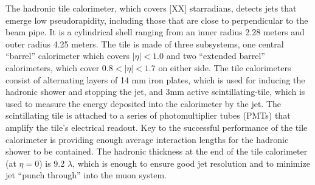 
The hadronic tile calorimeter, which covers [XX] starradians, detects jets that emerge low pseudorapidity, including those that are close to perpendicular to the beam pipe.
It is a cylindrical shell ranging from an inner radius 2.28 meters and outer radius 4.25 meters.
The tile is made of three subsystems, one central ``barrel'' calorimeter which covers $|\eta| < 1.0$ and two ``extended barrel'' calorimeters, which cover $0.8 < |\eta| < 1.7$ on either side.
The tile calorimeters consist of alternating layers of 14 mm iron plates, which is used for inducing the hadronic shower and stopping the jet, and 3mm active scintillating-tile, which is used to measure the energy deposited into the calorimeter by the jet.
The scintillating tile is attached to a series of photomultiplier tubes (PMTs) that amplify the tile's electrical readout.
Key to the successful performance of the tile calorimeter is providing enough average interaction lengths for the hadronic shower to be contained.
The hadronic thickness at the end of the tile calorimeter (at $\eta=0$) is 9.2 $\lambda$, which is enough to ensure good jet resolution and to minimize jet ``punch through'' into the muon system.


